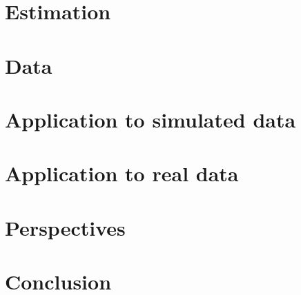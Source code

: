 \section{Estimation}


\section{Data}


\section{Application to simulated data}


\section{Application to real data}


\section{Perspectives}


\section{Conclusion}


\clearpage
\printbibliography
\clearpage


\appendix
\renewcommand\thefigure{\thesection.\arabic{figure}}
\setcounter{figure}{0}

\setcounter{page}{1}



\clearpage

\clearpage

\clearpage

\clearpage


%


